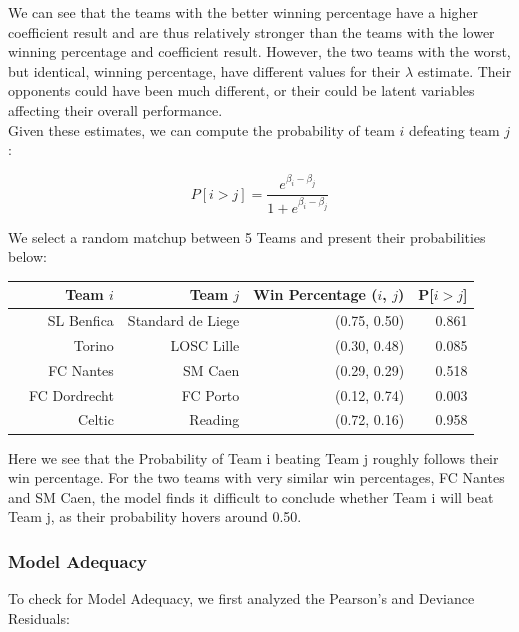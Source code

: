 \documentclass{article}
\begin{document}
We can see that the teams with the better winning percentage have a higher coefficient result and are thus relatively stronger than the teams with the lower winning percentage and coefficient result. However, the two teams with the worst, but identical, winning percentage, have different values for their $\lambda$ estimate. Their opponents could have been much different, or their could be latent variables affecting their overall performance.\\

Given these estimates, we can compute the probability of team $i$ defeating team $j$:

$$P[i > j] = \frac{e^{\beta_i - \beta_j}}{1 + e^{\beta_i - \beta_j}}$$

We select a random matchup between 5 Teams and present their probabilities below:

\begin{table}[H]
\centering
\begin{tabular}{rrrrr}
  \hline
 & Team $i$ & Team $j$ & Win Percentage ($i$, $j$) & P[$i > j$] \\ 
  \hline
 & SL Benfica  & Standard de Liege & (0.75, 0.50) & 0.861 \\ 
   & Torino & LOSC Lille & (0.30, 0.48) & 0.085 \\ 
   & FC Nantes & SM Caen & (0.29, 0.29)  & 0.518 \\ 
   & FC Dordrecht & FC Porto & (0.12, 0.74) & 0.003 \\ 
   & Celtic & Reading & (0.72, 0.16) & 0.958 \\ 
   \hline
\end{tabular}
\end{table}

Here we see that the Probability of Team i beating Team j roughly follows their win percentage. For the two teams with very similar win percentages, FC Nantes and SM Caen, the model finds it difficult to conclude whether Team i will beat Team j, as their probability hovers around 0.50. 

\subsubsection{Model Adequacy}

To check for Model Adequacy, we first analyzed the Pearson's and Deviance Residuals:
\end{document}
